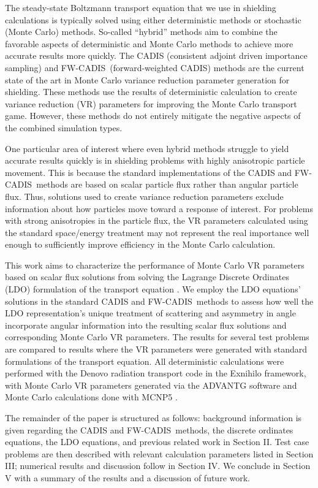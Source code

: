 \documentclass{article} %
\newcommand{\fwc}{\mbox{FW-CADIS}}
\begin{document}
The steady-state Boltzmann transport equation that we use in shielding
calculations is typically solved using either deterministic methods or
stochastic (Monte Carlo) methods. So-called ``hybrid'' methods aim to combine
the favorable aspects of deterministic and Monte Carlo methods to achieve more
accurate results more quickly. The CADIS (consistent adjoint driven importance
sampling) \cite{cadis} and \fwc\ (forward-weighted CADIS) \cite{fwcadis}
methods are the current state of the art in Monte Carlo variance reduction
parameter generation for shielding. These methods use the results of
deterministic calculation to create variance reduction (VR) parameters for
improving the Monte Carlo transport game. However, these methods do not
entirely mitigate the negative aspects of the combined simulation types.

One particular area of interest where even hybrid methods struggle to yield
accurate results quickly is in shielding problems with highly anisotropic
particle movement. This is because the standard implementations of the CADIS
and \fwc\ methods are based on scalar particle flux rather than angular
particle flux. Thus, solutions used to create variance reduction parameters
exclude information about how particles move toward a response of interest.
For problems with strong anisotropies in the particle flux, the VR parameters
calculated using the standard space/energy treatment may not represent the
real importance well enough to sufficiently improve efficiency in the Monte
Carlo calculation.

This work aims to characterize the performance of Monte Carlo VR
parameters based on scalar flux solutions from solving the Lagrange Discrete
Ordinates (LDO) formulation of the transport equation \cite{ahrens}. We employ
the LDO equations' solutions in the standard CADIS and \fwc\ methods to assess
how well the LDO representation's unique treatment of scattering and asymmetry
in angle incorporate angular information into the resulting scalar flux
solutions and corresponding Monte Carlo VR parameters. The results for
several test problems are compared to results where the VR parameters
were generated with standard formulations of the transport equation. All
deterministic calculations were performed with the Denovo radiation transport
code \cite{denovo} in the Exnihilo framework, with Monte Carlo VR
parameters generated via the ADVANTG software \cite{advantg} and Monte Carlo
calculations done with MCNP5 \cite{mcnp}.

The remainder of the paper is structured as follows: background information is
given regarding the CADIS and \fwc\ methods, the discrete ordinates equations,
the LDO equations, and previous related work in Section II. Test case
problems are then described with relevant calculation parameters listed in
Section III; numerical results and discussion follow in Section IV. We
conclude in Section V with a summary of the results and a discussion of
future work.
\end{document}

